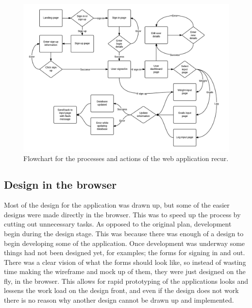 \begin{figure}[!ht]
\centering
\includegraphics[scale=0.2]{chapters/figs/flowchart}
\caption{Flowchart for the processes and actions of the web application recur.}
\label{fig:flowchart}
\end{figure}

\subsection{Design in the browser}
Most of the design for the application was drawn up, but some of the easier designs were made directly in the browser. This was to speed up the process by cutting out unnecessary tasks. As opposed to the original plan, development begin during the design stage. This was because there was enough of a design to begin developing some of the application. Once development was underway some things had not been designed yet, for examples; the forms for signing in and out. There was a clear vision of what the forms should look like, so instead of wasting time making the wireframe and mock up of them, they were just designed on the fly, in the browser. This allows for rapid prototyping of the applications looks and lessens the work load on the design front, and even if the design does not work there is no reason why another design cannot be drawn up and implemented.\\

